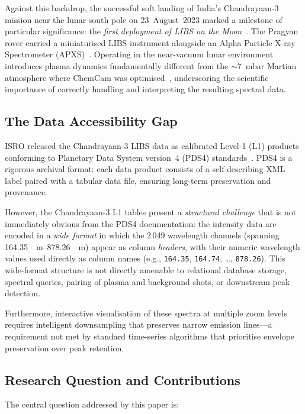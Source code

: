 \documentclass[a4paper,twocolumn,10pt]{article}
\begin{document}
Against this backdrop, the successful soft landing of India's
Chandrayaan-3 mission near the lunar south pole on 23~August~2023
marked a milestone of particular significance: the \emph{first
deployment of LIBS on the Moon}~\cite{ISROCh3}.  The Pragyan rover
carried a miniaturised LIBS instrument alongside an Alpha Particle
X-ray Spectrometer (APXS)~\cite{Laxmiprasad2020}.  Operating in the
near-vacuum lunar environment introduces plasma dynamics fundamentally
different from the $\sim$7~mbar Martian atmosphere where ChemCam was
optimised~\cite{Saeidfirozeh2024}, underscoring the scientific
importance of correctly handling and interpreting the resulting spectral
data.

\subsection{The Data Accessibility Gap}

ISRO released the Chandrayaan-3 LIBS data as calibrated Level-1 (L1)
products conforming to Planetary Data System version~4 (PDS4)
standards~\cite{Hughes2018}.  PDS4 is a rigorous archival format: each
data product consists of a self-describing XML label paired with a
tabular data file, ensuring long-term preservation and provenance.

However, the Chandrayaan-3 L1 tables present a \emph{structural
challenge} that is not immediately obvious from the PDS4 documentation:
the intensity data are encoded in a \emph{wide format} in which the
2\,049 wavelength channels (spanning \SIrange{164.35}{878.26}{\nano
\metre}) appear as column \emph{headers}, with their numeric wavelength
values used directly as column names (e.g., \texttt{164.35},
\texttt{164.74}, \ldots, \texttt{878.26}).  This wide-format structure
is not directly amenable to relational database storage, spectral queries,
pairing of plasma and background shots, or downstream peak detection.

Furthermore, interactive visualisation of these spectra at multiple zoom
levels requires intelligent downsampling that preserves narrow emission
lines---a requirement not met by standard time-series algorithms that
prioritise envelope preservation over peak retention.

\subsection{Research Question and Contributions}

The central question addressed by this paper is:
\end{document}
